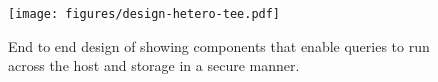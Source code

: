 \begin{figure}[t]
	\centering
	\texttt{[image: figures/design-hetero-tee.pdf]}
	\caption{End to end design of \project{} showing components that enable queries to run across the host and storage in a secure manner.}
	\label{fig:end-end-design}
\end{figure}